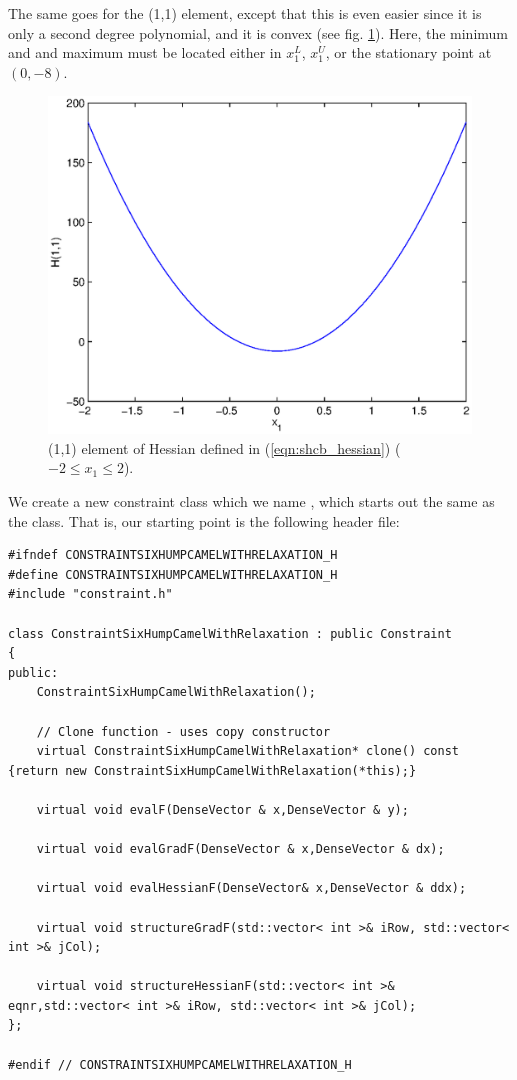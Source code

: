 The same goes for the (1,1) element, except that this is even easier since it is only a second degree polynomial, and it is convex (see fig. \ref{fig:shcb_h11}). Here, the minimum and and maximum must be located either in $x_1^L$, $x_1^U$, or the stationary point at $(0,-8)$.
\begin{figure}[H]
\centering
\includegraphics[scale=0.3]{figures/shcb_h11}
\caption{(1,1) element of Hessian defined in (\ref{eqn:shcb_hessian}) ($-2 \leq x_1 \leq 2$).}
\label{fig:shcb_h11}
\end{figure}
We create a new constraint class which we name , which starts out the same as the  class. That is, our starting point is the following header file:
\begin{lstlisting}
#ifndef CONSTRAINTSIXHUMPCAMELWITHRELAXATION_H
#define CONSTRAINTSIXHUMPCAMELWITHRELAXATION_H
#include "constraint.h"

class ConstraintSixHumpCamelWithRelaxation : public Constraint
{
public:
    ConstraintSixHumpCamelWithRelaxation();
    
    // Clone function - uses copy constructor
    virtual ConstraintSixHumpCamelWithRelaxation* clone() const {return new ConstraintSixHumpCamelWithRelaxation(*this);}

    virtual void evalF(DenseVector & x,DenseVector & y);

    virtual void evalGradF(DenseVector & x,DenseVector & dx);

    virtual void evalHessianF(DenseVector& x,DenseVector & ddx);

    virtual void structureGradF(std::vector< int >& iRow, std::vector< int >& jCol);

    virtual void structureHessianF(std::vector< int >& eqnr,std::vector< int >& iRow, std::vector< int >& jCol); 
};

#endif // CONSTRAINTSIXHUMPCAMELWITHRELAXATION_H
\end{lstlisting}
